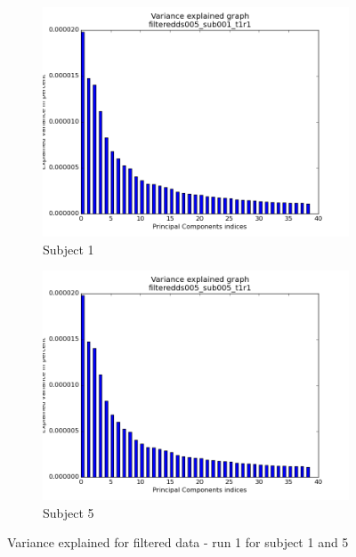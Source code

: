 \begin{figure}[H]
\begin{subfigure}{.5\textwidth}
  \centering
  \includegraphics[width=.9\linewidth]{../fig/pca/filteredds005_sub001_t1r1_variance_explained.png}
  \caption{Subject 1}
  \label{fig:fig3}
\end{subfigure}%
\begin{subfigure}{.5\textwidth}
  \centering
  \includegraphics[width=.9\linewidth]{../fig/pca/filteredds005_sub005_t1r1_variance_explained.png}
  \caption{Subject 5}
  \label{fig:fig4}
\end{subfigure}
\caption{Variance explained for filtered data - run 1 for subject 1 and 5}
\label{fig:figb}
\end{figure}


